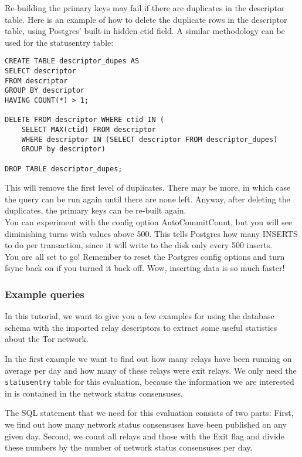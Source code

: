 \documentclass{article}
\begin{document}
Re-building the primary keys may fail if there are duplicates in the
descriptor table. Here is an example of how to delete the duplicate rows in
the descriptor table, using Postgres' built-in hidden ctid field. A similar
methodology can be used for the statusentry table:

\begin{verbatim}
CREATE TABLE descriptor_dupes AS
SELECT descriptor
FROM descriptor
GROUP BY descriptor
HAVING COUNT(*) > 1;

DELETE FROM descriptor WHERE ctid IN (
    SELECT MAX(ctid) FROM descriptor
    WHERE descriptor IN (SELECT descriptor FROM descriptor_dupes)
    GROUP by descriptor)

DROP TABLE descriptor_dupes;
\end{verbatim}

This will remove the first level of duplicates. There may be more, in which
case the query can be run again until there are none left. Anyway, after
deleting the duplicates, the primary keys can be re-built again.
\\

You can experiment with the config option AutoCommitCount, but you will see
diminishing turns with values above 500. This tells Postgres how many INSERTS to
do per transaction, since it will write to the disk only every 500 inserts.
\\

You are all set to go! Remember to reset the Postgres config options and turn
fsync back on if you turned it back off. Wow, inserting data is so much faster!

\subsubsection{Example queries}

In this tutorial, we want to give you a few examples for using the
database schema with the imported relay descriptors to extract some useful
statistics about the Tor network.

In the first example we want to find out how many relays have been running
on average per day and how many of these relays were exit relays.
We only need the \verb+statusentry+ table for this evaluation, because
the information we are interested in is contained in the network status
consensuses.

The SQL statement that we need for this evaluation consists of two parts:
First, we find out how many network status consensuses have been published
on any given day.
Second, we count all relays and those with the Exit flag and divide these
numbers by the number of network status consensuses per day.
\end{document}

